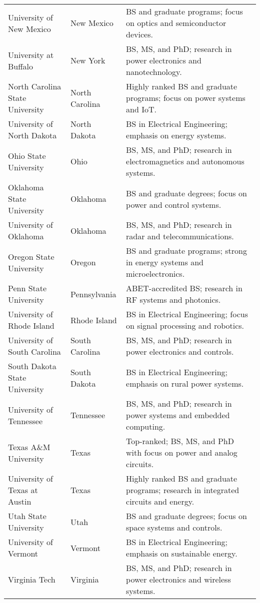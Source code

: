 \documentclass[12pt]{article}
\begin{document}
\begin{longtable}{p{} p{} p{}}
University of New Mexico & New Mexico & BS and graduate programs; focus on optics and semiconductor devices. \\
University at Buffalo & New York & BS, MS, and PhD; research in power electronics and nanotechnology. \\
North Carolina State University & North Carolina & Highly ranked BS and graduate programs; focus on power systems and IoT. \\
University of North Dakota & North Dakota & BS in Electrical Engineering; emphasis on energy systems. \\
Ohio State University & Ohio & BS, MS, and PhD; research in electromagnetics and autonomous systems. \\
Oklahoma State University & Oklahoma & BS and graduate degrees; focus on power and control systems. \\
University of Oklahoma & Oklahoma & BS, MS, and PhD; research in radar and telecommunications. \\
Oregon State University & Oregon & BS and graduate programs; strong in energy systems and microelectronics. \\
Penn State University & Pennsylvania & ABET-accredited BS; research in RF systems and photonics. \\
University of Rhode Island & Rhode Island & BS in Electrical Engineering; focus on signal processing and robotics. \\
University of South Carolina & South Carolina & BS, MS, and PhD; research in power electronics and controls. \\
South Dakota State University & South Dakota & BS in Electrical Engineering; emphasis on rural power systems. \\
University of Tennessee & Tennessee & BS, MS, and PhD; research in power systems and embedded computing. \\
Texas A\&M University & Texas & Top-ranked; BS, MS, and PhD with focus on power and analog circuits. \\
University of Texas at Austin & Texas & Highly ranked BS and graduate programs; research in integrated circuits and energy. \\
Utah State University & Utah & BS and graduate degrees; focus on space systems and controls. \\
University of Vermont & Vermont & BS in Electrical Engineering; emphasis on sustainable energy. \\
Virginia Tech & Virginia & BS, MS, and PhD; research in power electronics and wireless systems. \\

\end{longtable}
\end{document}
